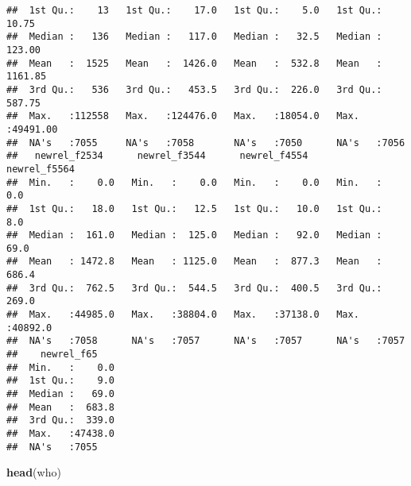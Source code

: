 \documentclass[]{article}
\newenvironment{Shaded}{\begin{snugshade}}{\end{snugshade}}
\newcommand{\KeywordTok}[1]{\textcolor[rgb]{0.13,0.29,0.53}{\textbf{#1}}}
\newcommand{\NormalTok}[1]{#1}
\begin{document}
\begin{verbatim}
##  1st Qu.:    13   1st Qu.:    17.0   1st Qu.:    5.0   1st Qu.:   10.75  
##  Median :   136   Median :   117.0   Median :   32.5   Median :  123.00  
##  Mean   :  1525   Mean   :  1426.0   Mean   :  532.8   Mean   : 1161.85  
##  3rd Qu.:   536   3rd Qu.:   453.5   3rd Qu.:  226.0   3rd Qu.:  587.75  
##  Max.   :112558   Max.   :124476.0   Max.   :18054.0   Max.   :49491.00  
##  NA's   :7055     NA's   :7058       NA's   :7050      NA's   :7056      
##   newrel_f2534      newrel_f3544      newrel_f4554      newrel_f5564    
##  Min.   :    0.0   Min.   :    0.0   Min.   :    0.0   Min.   :    0.0  
##  1st Qu.:   18.0   1st Qu.:   12.5   1st Qu.:   10.0   1st Qu.:    8.0  
##  Median :  161.0   Median :  125.0   Median :   92.0   Median :   69.0  
##  Mean   : 1472.8   Mean   : 1125.0   Mean   :  877.3   Mean   :  686.4  
##  3rd Qu.:  762.5   3rd Qu.:  544.5   3rd Qu.:  400.5   3rd Qu.:  269.0  
##  Max.   :44985.0   Max.   :38804.0   Max.   :37138.0   Max.   :40892.0  
##  NA's   :7058      NA's   :7057      NA's   :7057      NA's   :7057     
##    newrel_f65     
##  Min.   :    0.0  
##  1st Qu.:    9.0  
##  Median :   69.0  
##  Mean   :  683.8  
##  3rd Qu.:  339.0  
##  Max.   :47438.0  
##  NA's   :7055
\end{verbatim}

\begin{Shaded}
\begin{Highlighting}[]
\KeywordTok{head}\NormalTok{(who)}
\end{Highlighting}
\end{Shaded}
\end{document}
